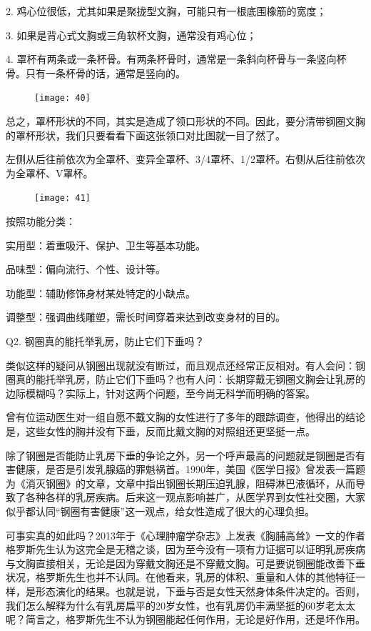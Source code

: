 \documentclass[12pt,UTF8]{ctexbook}
\begin{document}
2. 鸡心位很低，尤其如果是聚拢型文胸，可能只有一根底围橡筋的宽度；

3. 如果是背心式文胸或三角软杯文胸，通常没有鸡心位；

4. 罩杯有两条或一条杯骨。有两条杯骨时，通常是一条斜向杯骨与一条竖向杯骨。只有一条杯骨的话，通常是竖向的。

\begin{figure}[htbp]
	\centering
	\texttt{[image: 40]}
	\caption{}
	\label{fig:1}
\end{figure}

总之，罩杯形状的不同，其实是造成了领口形状的不同。因此，要分清带钢圈文胸的罩杯形状，我们只要看看下面这张领口对比图就一目了然了。

左侧从后往前依次为全罩杯、变异全罩杯、3/4罩杯、1/2罩杯。右侧从后往前依次为全罩杯、V罩杯。

\begin{figure}[htbp]
	\centering
	\texttt{[image: 41]}
	\caption{}
	\label{fig:1}
\end{figure}

按照功能分类：

实用型：着重吸汗、保护、卫生等基本功能。

品味型：偏向流行、个性、设计等。

功能型：辅助修饰身材某处特定的小缺点。

调整型：强调曲线雕塑，需长时间穿着来达到改变身材的目的。

Q2. 钢圈真的能托举乳房，防止它们下垂吗？

类似这样的疑问从钢圈出现就没有断过，而且观点还经常正反相对。有人会问：钢圈真的能托举乳房，防止它们下垂吗？也有人问：长期穿戴无钢圈文胸会让乳房的边际模糊吗？实际上，针对这两个问题，至今尚无科学而明确的答案。

曾有位运动医生对一组自愿不戴文胸的女性进行了多年的跟踪调查，他得出的结论是，这些女性的胸并没有下垂，反而比戴文胸的对照组还更坚挺一点。

除了钢圈是否能防止乳房下垂的争论之外，另一个呼声最高的问题就是钢圈是否有害健康，是否是引发乳腺癌的罪魁祸首。1990年，美国《医学日报》曾发表一篇题为《消灭钢圈》的文章，文章中指出钢圈长期压迫乳腺，阻碍淋巴液循环，从而导致了各种各样的乳房疾病。后来这一观点影响甚广，从医学界到女性社交圈，大家似乎都认同“钢圈有害健康”这一观点，给女性造成了很大的心理负担。

可事实真的如此吗？2013年于《心理肿瘤学杂志》上发表《胸脯高耸》一文的作者格罗斯先生认为这完全是无稽之谈，因为至今没有一项有力证据可以证明乳房疾病与文胸直接相关，无论是因为穿戴文胸还是不穿戴文胸。可是要说钢圈能改善下垂状况，格罗斯先生也并不认同。在他看来，乳房的体积、重量和人体的其他特征一样，是形态演化的结果。也就是说，下垂与否是女性天然身体条件决定的。否则，我们怎么解释为什么有乳房扁平的20岁女性，也有乳房仍丰满坚挺的60岁老太太呢？简言之，格罗斯先生不认为钢圈能起任何作用，无论是好作用，还是坏作用。
\end{document}
